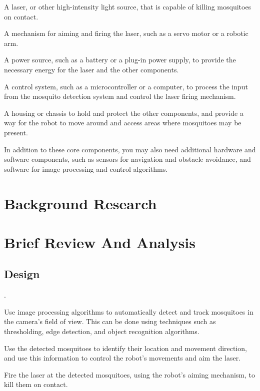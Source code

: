 \documentclass[11pt]{article}
\begin{document}
\begin{itemize}
		
		A laser, or other high-intensity light source, that is capable of killing mosquitoes on contact.
		
		A mechanism for aiming and firing the laser, such as a servo motor or a robotic arm.
		
		A power source, such as a battery or a plug-in power supply, to provide the necessary energy for the laser and the other components.
		
		A control system, such as a microcontroller or a computer, to process the input from the mosquito detection system and control the laser firing mechanism.
		
		A housing or chassis to hold and protect the other components, and provide a way for the robot to move around and access areas where mosquitoes may be present.
		
		In addition to these core components, you may also need additional hardware and software components, such as sensors for navigation and obstacle avoidance, and software for image processing and control algorithms.
		
		
		
		
	\end{itemize}
	
	\section{Background Research}
	\section{Brief Review And Analysis}
	
	
	\subsection{Design}
	
	
	
	
	.
	
	Use image processing algorithms to automatically detect and track mosquitoes in the camera's field of view. This can be done using techniques such as thresholding, edge detection, and object recognition algorithms.
	
	Use the detected mosquitoes to identify their location and movement direction, and use this information to control the robot's movements and aim the laser.
	
	Fire the laser at the detected mosquitoes, using the robot's aiming mechanism, to kill them on contact.
	
\end{document}
